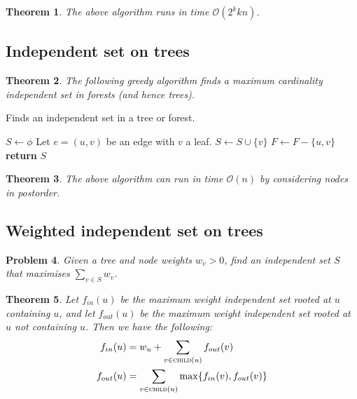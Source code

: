 \documentclass[10pt, oneside, reqno]{amsart}
\theoremstyle{plain}%
\newtheorem{thm}{Theorem}[section]
\newtheorem{prob}[thm]{Problem}
\theoremstyle{definition}
\theoremstyle{remark}
\newcommand{\bigo}[1]{\mathcal{O}(#1)}
\begin{document}
\begin{thm}
    The above algorithm runs in time $\bigo{2^k k n}$.
\end{thm}

\subsection{Independent set on trees} %
\label{sub:independent_set_on_trees}

\begin{thm}
    The following greedy algorithm finds a maximum cardinality independent set in forests (and hence trees).
\end{thm}

\begin{algorithm}[H]
    \label{alg:Vecter Cover}
    \caption{Finds an independent set in a tree or forest.}
    \begin{algorithmic}[1]
            \State $S \gets \phi$
                \State Let $e = (u,v)$ be an edge with $v$ a leaf.
                \State $S \gets S \cup \{ v\}$
                \State $F \gets F - \{ u, v \}$
            \EndWhile
        \State \textbf{return} $S$
        \EndProcedure
    \end{algorithmic}
\end{algorithm}

\begin{thm}
    The above algorithm can run in time $\bigo{n}$ by considering nodes in postorder.
\end{thm}

\subsection{Weighted independent set on trees} %
\label{sub:weighted_independent_set_on_trees}
\begin{prob}
    Given a tree and node weights $w_v > 0$, find an independent set $S$ that maximises $\sum_{v \in S} w_v$.
\end{prob}

\begin{thm}
    Let $f_{in}(u)$ be the maximum weight independent set rooted at $u$ containing $u$, and let $f_{out}(u)$ be the maximum weight independent set rooted at $u$ not containing $u$.  Then we have the following:
    \begin{align*}
        f_{in}(u) &= w_u + \sum_{v \in \textsc{child}(u)} f_{out}(v) \\
        f_{out}(u) &= \sum_{v \in \textsc{child}(u)} \max \{f_{in}(v), f_{out}(v)\}     
    \end{align*}
\end{thm}
\end{document}
